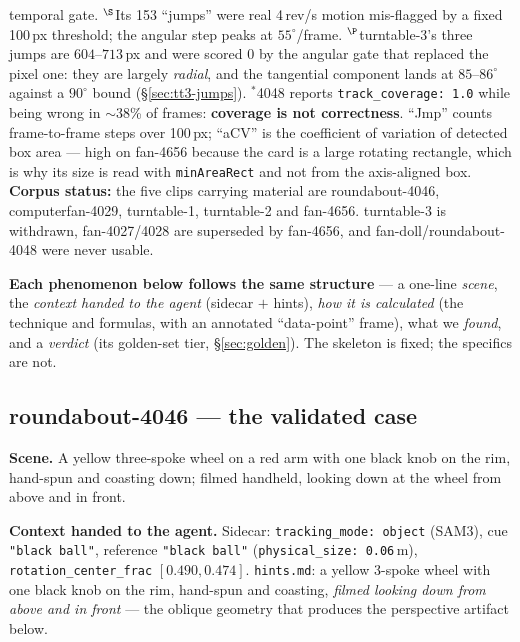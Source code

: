 \documentclass[11pt,a4paper]{article}
\begin{document}
\begin{table}[htbp]
{temporal gate. $^\S$Its 153 ``jumps'' were real 4\,rev/s motion mis-flagged by a fixed 100\,px
threshold; the angular step peaks at $55^\circ$/frame. $^\P$turntable-3's three jumps are
$604$--$713$\,px and were scored $0$ by the angular gate that replaced the pixel one: they are
largely \emph{radial}, and the tangential component lands at $85$--$86^\circ$ against a
$90^\circ$ bound (\S\ref{sec:tt3-jumps}). $^\ast$4048 reports \texttt{track\_coverage: 1.0}
while being wrong in $\sim$38\% of frames: \textbf{coverage is not correctness}.
``Jmp'' counts frame-to-frame steps over 100\,px; ``aCV'' is the coefficient of variation of
detected box area --- high on fan-4656 because the card is a large rotating rectangle, which is
why its size is read with \texttt{minAreaRect} and not from the axis-aligned box.
\textbf{Corpus status:} the five clips carrying material are roundabout-4046, computerfan-4029,
turntable-1, turntable-2 and fan-4656. turntable-3 is withdrawn, fan-4027/4028 are superseded by
fan-4656, and fan-doll/roundabout-4048 were never usable.}
\label{tab:corpus}
\end{table}

\textbf{Each phenomenon below follows the same structure} --- a one-line \emph{scene}, the
\emph{context handed to the agent} (sidecar $+$ hints), \emph{how it is calculated} (the technique
and formulas, with an annotated ``data-point'' frame), what we \emph{found}, and a \emph{verdict}
(its golden-set tier, \S\ref{sec:golden}). The skeleton is fixed; the specifics are not.

\subsection{roundabout-4046 --- the validated case}

\textbf{Scene.} A yellow three-spoke wheel on a red arm with one black knob on the rim, hand-spun and
coasting down; filmed handheld, looking down at the wheel from above and in front.

\textbf{Context handed to the agent.} Sidecar: \texttt{tracking\_mode: object} (SAM3), cue
\texttt{"black ball"}, reference \texttt{"black ball"} (\texttt{physical\_size: 0.06}\,m),
\texttt{rotation\_center\_frac} $[0.490,0.474]$. \texttt{hints.md}: a yellow 3-spoke wheel with one
black knob on the rim, hand-spun and coasting, \emph{filmed looking down from above and in front}
--- the oblique geometry that produces the perspective artifact below.
\end{document}

